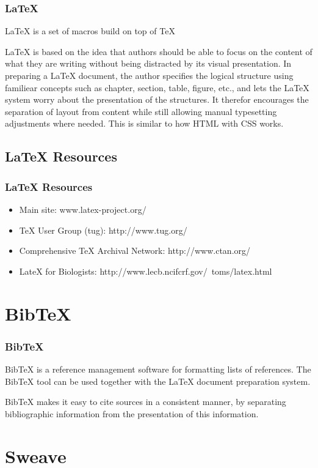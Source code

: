 \documentclass[pdf]{beamer}
\begin{document}
\begin{frame}%
  \frametitle{LaTeX}
  LaTeX is a set of macros build on top of TeX
  
  LaTeX is based on the idea that authors should be able to focus on the content of what they are writing without being distracted by its visual presentation. In preparing a LaTeX document, the author specifies the logical structure using familiear concepts such as chapter, section, table, figure, etc., and lets the LaTeX system worry about the presentation of the structures. It therefor encourages the separation of layout from content while still allowing manual typesetting adjustments where needed. This is similar to how HTML with CSS works.
\end{frame}

\subsection{LaTeX Resources}
\begin{frame}
  \frametitle{LaTeX Resources}
  \begin{itemize}
  \item Main site: www.latex-project.org/
  \item TeX User Group (tug): http://www.tug.org/
  \item Comprehensive TeX Archival Network: http://www.ctan.org/
  \item LateX for Biologists: http://www.lecb.ncifcrf.gov/~toms/latex.html
  \end{itemize}
  
\end{frame}

\section{BibTeX}
\begin{frame}
  \frametitle{BibTeX}
  BibTeX is a reference management software for formatting lists of references. The BibTeX tool can be used together with the LaTeX document preparation system.
  
BibTeX makes it easy to cite sources in a consistent manner, by separating bibliographic information from the presentation of this information. 
\end{frame}

\section{Sweave}
\end{document}
